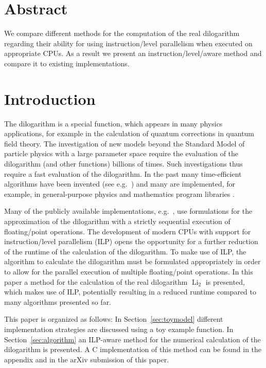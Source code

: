 \documentclass[10pt,DIV16,twocolumn,numbers=noenddot]{scrartcl}
\title{\mytitle}
\author{\myauthor}
\affil{Fachbereich Energie und Biotechnologie, Hochschule Flensburg,\\ Kanzleistra{\ss}e 91--93, 24943 Flensburg, Germany}
\date{\today}
\newcommand{\Li}{\operatorname{Li}_2}
\newcommand{\secref}[1]{Section~\ref{#1}}
\begin{document}
\maketitle

\section*{Abstract}

We compare different methods for the computation of the real
dilogarithm regarding their ability for using instruction\-/level
parallelism when executed on appropriate CPUs.  As a result we present
an instruction\-/level\-/aware method and compare it to existing
implementations.

\section{Introduction}

The dilogarithm \cite{lewin} is a special function, which appears in
many physics applications, for example in the calculation of quantum
corrections in quantum field theory.  The investigation of new models
beyond the Standard Model of particle physics with a large parameter
space require the evaluation of the dilogarithm (and other functions)
billions of times.  Such investigations thus require a fast evaluation
of the dilogarithm.  In the past many time-efficient algorithms have
been invented (see e.g.~\cite{koelbigDilog,ginsberg,morris}) and many
are implemented, for example, in general-purpose physics and
mathematics program libraries \cite{root,gsl,cephes}.

Many of the publicly available implementations, e.g.\ \cite{root,gsl},
use formulations for the approximation of the dilogarithm with a
strictly sequential execution of floating\-/point operations.  The
development of modern CPUs with support for instruction\-/level
parallelism (ILP) opens the opportunity for a further reduction of the
runtime of the calculation of the dilogarithm.  To make use of ILP,
the algorithm to calculate the dilogarithm must be formulated
appropriately in order to allow for the parallel execution of multiple
floating\-/point operations.  In this paper a method for the
calculation of the real dilogarithm $\Li$ is presented, which makes
use of ILP, potentially resulting in a reduced runtime compared to
many algorithms presented so far.

This paper is organized as follows: In \secref{sec:toymodel} different
implementation strategies are discussed using a toy example function.
In \secref{sec:algorithm} an ILP-aware method for the numerical
calculation of the dilogarithm is presented.  A C implementation of
this method can be found in the appendix and in the arXiv submission
of this paper.
\end{document}
